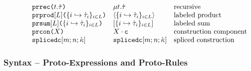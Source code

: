 \[\begin{array}{lrlllll}
&&& \acerec{t}{\ctau} & \rect{t}{\ctau} & \text{recursive}\\
&&& \aceprod{\labelset}{\mapschema{\ctau}{i}{\labelset}} & \prodt{\mapschema{\ctau}{i}{\labelset}} & \text{labeled product}\\
&&& \acesum{\labelset}{\mapschema{\ctau}{i}{\labelset}} & \sumt{\mapschema{\ctau}{i}{\labelset}} & \text{labeled sum}\\
&&& \acemcon{X} & \mcon{X} & \text{construction component}\\
&&& \acesplicedc{m}{n}{\cekappa} & \splicedc{m}{n}{\cekappa} & \text{spliced construction}%
\end{array}\]

\subsubsection{Syntax -- Proto-Expressions and Proto-Rules}

